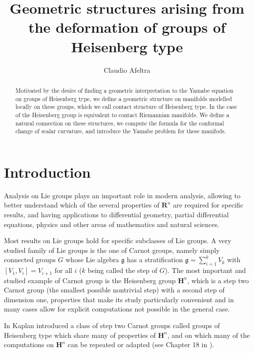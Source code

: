 \documentclass{article}
\title{Geometric structures arising from the deformation of groups of Heisenberg type}
\author{Claudio Afeltra}
\date{}
\newcommand{\g}[1]{\mathfrak{#1}}
\newcommand{\R}{\mathbf{R}}
\renewcommand{\H}{\mathbf{H}}
\theoremstyle{definition}
\theoremstyle{remark}
\begin{document}
\maketitle

\begin{abstract}
 Motivated by the desire of finding a geometric interpretation to the Yamabe equation on groups of Heisenberg type, we define a geometric structure on manifolds modelled locally on these groups, which we call contact structure of Heisenberg type. In the case of the Heisenberg group is equivalent to contact Riemannian manifolds.
 We define a natural connection on these structures, we compute the formula for the conformal change of scalar curvature, and introduce the Yamabe problem for these manifods.
\end{abstract}

\section{Introduction}
Analysis on Lie groups plays an important role in modern analysis, allowing to better understand which of the several properties of $\R^n$ are required for specific results, and having applications to differential geometry, partial differential equations, physics and other areas of mathematics and natural sciences.

Most results on Lie groups hold for specific subclasses of Lie groups.
A very studied family of Lie groups is the one of Carnot groups, namely simply connected groups $G$ whose Lie algebra $\g{g}$ has a stratification $\g{g}=\sum_{i=1}^kV_k$ with $[V_1,V_i]=V_{i+1}$ for all $i$ ($k$ being called the step of $G$).
The most important and studied example of Carnot group is the Heisenberg group $\H^n$, which is a step two Carnot group (the smallest possible nontrivial step) with a second step of dimension one, properties that make its study particularly convenient and in many cases allow for explicit computations not possible in the general case.

In \cite{K} Kaplan introduced a class of step two Carnot groups called groups of Heisenberg type which share many of properties of $\H^n$, and on which many of the computations on $\H^n$ can be repeated or adapted (see \cite{CDKR} Chapter 18 in \cite{BLU}).
\end{document}

